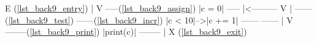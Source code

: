 \begin{minipage}[t]{2in}%
\label{lst_back9_entry}%
\label{lst_back9_assign}%
\label{lst_back9_test}%
\label{lst_back9_incr}%
\label{lst_back9_print}%
\label{lst_back9_exit}%
\begin{AVerb}
        E (\ref{lst_back9_entry})
        |
        V
      -----(\ref{lst_back9_assign})
     |c = 0|
      -----
        |<---------
        V          |
      ------(\ref{lst_back9_test})  ------(\ref{lst_back9_incr})
     |c < 10|-->|c += 1|
      ------     ------
        |
        V
     --------(\ref{lst_back9_print})
    |print(c)|
     --------
        |
        X (\ref{lst_back9_exit})
\end{AVerb}
\end{minipage}
